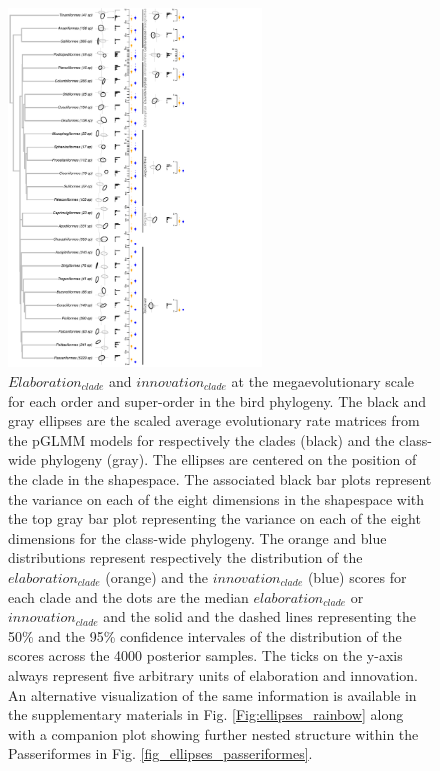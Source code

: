 \documentclass[12pt,letterpaper]{article}
\begin{document}
{\begin{figure}[!htbp]
\centering
   \includegraphics[width=0.6\textwidth]{Figures/figure_phylo_spiro_dark.pdf}
\caption{\scriptsize{$Elaboration_{clade}$ and $innovation_{clade}$ at the megaevolutionary scale for each order and super-order in the bird phylogeny.
The black and gray ellipses are the scaled average evolutionary rate matrices from the pGLMM models for respectively the clades (black) and the class-wide phylogeny (gray).
The ellipses are centered on the position of the clade in the shapespace.
The associated black bar plots represent the variance on each of the eight dimensions in the shapespace with the top gray bar plot representing the variance on each of the eight dimensions for the class-wide phylogeny.
The orange and blue distributions represent respectively the distribution of the $elaboration_{clade}$ (orange) and the $innovation_{clade}$ (blue) scores for each clade and the dots are the median $elaboration_{clade}$ or $innovation_{clade}$ and the solid and the dashed lines representing the 50\% and the 95\% confidence intervales of the distribution of the scores across the 4000 posterior samples.
The ticks on the y-axis always represent five arbitrary units of elaboration and innovation.
An alternative visualization of the same information is available in the supplementary materials in Fig. \ref{Fig:ellipses_rainbow} along with a companion plot showing further nested structure within the Passeriformes in Fig. \ref{fig_ellipses_passeriformes}.}
}
\label{Fig:ellipses}
\end{figure}

}
\end{document}
